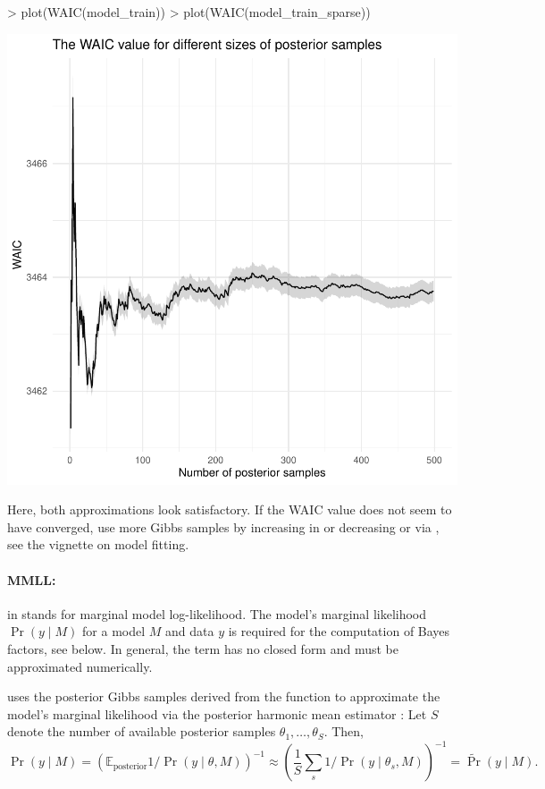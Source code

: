 \documentclass[article]{jss}
\newcommand{\fct}[1]{\code{#1()}}
\begin{document}
\begin{Schunk}
\begin{Sinput}
> plot(WAIC(model_train))
> plot(WAIC(model_train_sparse))
\end{Sinput}
\end{Schunk}
\includegraphics{rprobitb_oelschlaeger_bauer-waictrace}

Here, both approximations look satisfactory. If the WAIC value does not seem to have converged, use more Gibbs samples by increasing  in \fct{mcmc} or decreasing  or  via \fct{transform}, see the vignette on model fitting.

\paragraph{MMLL:}

 in  stands for marginal model log-likelihood. The model's marginal likelihood $\Pr(y\mid M)$ for a model $M$ and data $y$ is required for the computation of Bayes factors, see below. In general, the term has no closed form and must be approximated numerically.

 uses the posterior Gibbs samples derived from the \fct{mcmc} function to approximate the model's marginal likelihood via the posterior harmonic mean estimator \citep{Newton:1994}: Let $S$ denote the number of available posterior samples $\theta_1,\dots,\theta_S$. Then,
$$\Pr(y\mid M) = \left(\mathbb{E}_\text{posterior} 1/\Pr(y\mid \theta,M) \right)^{-1} \approx \left( \frac{1}{S} \sum_s 1/\Pr(y\mid \theta_s,M) \right) ^{-1} = \tilde{\Pr}(y\mid M).$$
\end{document}
